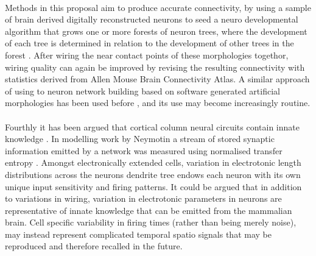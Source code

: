 \documentclass[a4paper,11pt]{article}
\begin{document}
\\ %
Methods in this proposal aim to produce accurate connectivity, by using a sample of brain derived digitally reconstructed neurons to seed a neuro developmental algorithm that grows one or more forests of neuron trees, where the development of each tree is determined in relation to the development of other trees in the forest \cite{torben2014context}. After wiring the near contact points of these morphologies togethor, wiring quality can again be improved by revising the resulting  connectivity with statistics derived from Allen Mouse Brain Connectivity Atlas. A similar approach of using to neuron network building based on software generated artificial morphologies has been used before \cite{migliore2014distributed}, and its use may become increasingly routine.\\ 
\\
Fourthly it has been argued that cortical column neural circuits contain innate knowledge \cite{markram2011innate}. In modelling work by Neymotin a stream of stored synaptic information emitted by a network was measured using normalised transfer entropy \cite{neymotin2011synaptic}. Amongst electronically extended cells, variation in electrotonic length distributions across the neurons dendrite tree endows each neuron with its own unique input sensitivity and firing patterns. It could be argued that in addition to variations in wiring, variation in electrotonic parameters in neurons are representative of innate knowledge that can be emitted from the mammalian brain. Cell specific variability in firing times (rather than being merely noise), may instead represent complicated temporal spatio signals that may be reproduced and therefore recalled in the future.\\
\\
\end{document}
